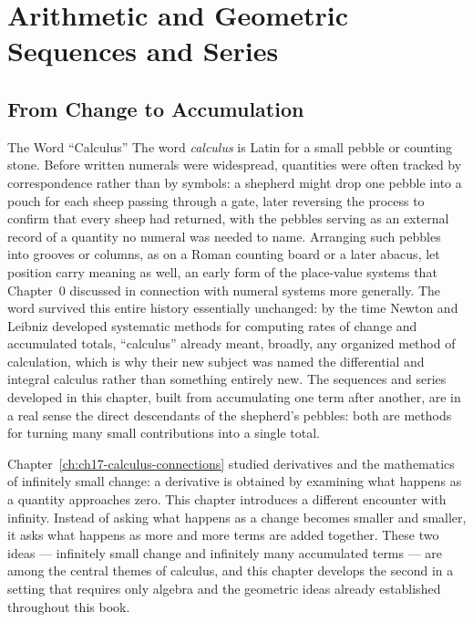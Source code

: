 \chapter{Arithmetic and Geometric Sequences and Series}
\label{ch:ch18-sequences-series}

\section{From Change to Accumulation}

\begin{historicalnote}{The Word ``Calculus''}
The word \emph{calculus} is Latin for a small pebble or counting stone.
Before written numerals were widespread, quantities were often tracked
by correspondence rather than by symbols: a shepherd might drop one
pebble into a pouch for each sheep passing through a gate, later
reversing the process to confirm that every sheep had returned, with the
pebbles serving as an external record of a quantity no numeral was
needed to name. Arranging such pebbles into grooves or columns, as on a
Roman counting board or a later abacus, let position carry meaning as
well, an early form of the place-value systems that Chapter~0 discussed
in connection with numeral systems more generally. The word survived
this entire history essentially unchanged: by the time Newton and
Leibniz developed systematic methods for computing rates of change and
accumulated totals, ``calculus'' already meant, broadly, any organized
method of calculation, which is why their new subject was named the
differential and integral calculus rather than something entirely new.
The sequences and series developed in this chapter, built from
accumulating one term after another, are in a real sense the direct
descendants of the shepherd's pebbles: both are methods for turning many
small contributions into a single total.
\end{historicalnote}

Chapter~\ref{ch:ch17-calculus-connections} studied derivatives and the
mathematics of infinitely small change: a derivative is obtained by
examining what happens as a quantity approaches zero. This chapter
introduces a different encounter with infinity. Instead of asking what
happens as a change becomes smaller and smaller, it asks what happens as
more and more terms are added together. These two ideas --- infinitely
small change and infinitely many accumulated terms --- are among the
central themes of calculus, and this chapter develops the second in a
setting that requires only algebra and the geometric ideas already
established throughout this book.

